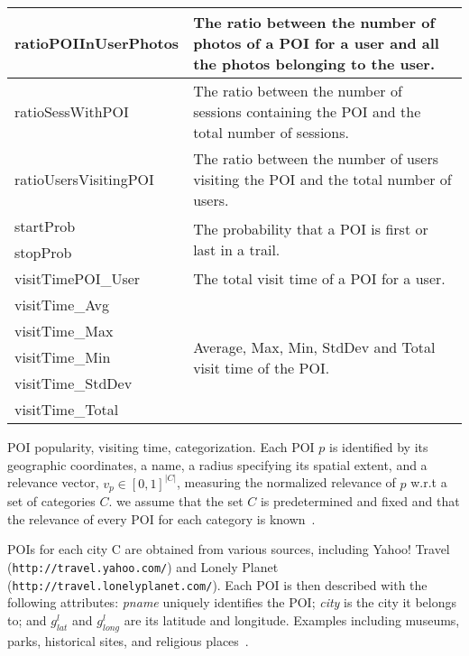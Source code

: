 \documentclass[9pt]{extarticle}
\begin{document}
\begin{table}[ht]
\begin{tabular}{l|m{}}
ratioPOIInUserPhotos     & The ratio between the number of photos of a POI for a user and all the photos belonging to the user. \\ \hline
ratioSessWithPOI         & The ratio between the number of sessions containing the POI and the total number of sessions. \\ \hline
ratioUsersVisitingPOI    & The ratio between the number of users visiting the POI and the total number of users. \\ \hline
startProb                & \multirow{2}{*}{The probability that a POI is first or last in a trail.} \\  
stopProb                 & \\ \hline
visitTimePOI\_User       & The total visit time of a POI for a user. \\ \hline
visitTime\_Avg           & \multirow{5}{*}{Average, Max, Min, StdDev and Total visit time of the POI.} \\
visitTime\_Max           & \\
visitTime\_Min           & \\ 
visitTime\_StdDev        & \\
visitTime\_Total         & \\ \hline
\end{tabular}
\end{table}


POI popularity, visiting time, categorization.
Each POI $p$ is identified by its geographic coordinates, a name, a radius specifying its spatial extent, 
and a relevance vector, $v_p \in [0, 1]^{|C|}$, measuring the normalized relevance of $p$ w.r.t a set of categories $C$. 
we assume that the set $C$ is predetermined and fixed and that the relevance of every POI for each category is known~\cite{brilhante2013shall}.


POIs for each city C are obtained from various sources, including Yahoo! Travel (\texttt{http://travel.yahoo.com/}) and 
Lonely Planet (\texttt{http://travel.lonelyplanet.com/}).
Each POI is then described with the following attributes: \textit{pname} uniquely identifies the POI;
\textit{city} is the city it belongs to; and $g_{lat}^l$ and $g_{long}^l$ are its latitude and longitude. 
Examples including museums, parks, historical sites, and religious places~\cite{ht10}.
\end{document}
